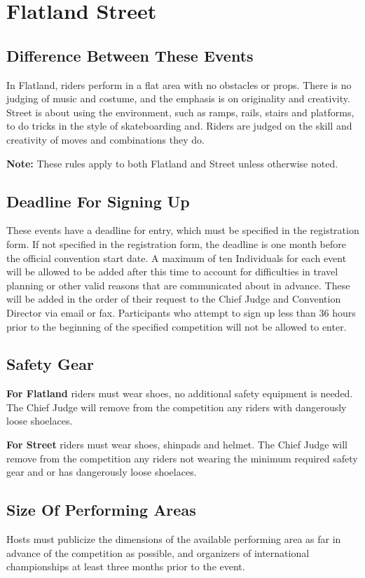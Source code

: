\chapter{Flatland Street \label{chap:flat-street}}

\section{Difference Between These Events}
In Flatland, riders perform in a flat area with no obstacles or props.
There is no judging of music and costume, and the emphasis is on originality and creativity.
Street is about using the environment, such as ramps, rails, stairs and platforms, to do tricks in the style of skateboarding and.
Riders are judged on the skill and creativity of moves and combinations they do.

\textbf{Note:} These rules apply to both Flatland and Street unless otherwise noted.

\section{Deadline For Signing Up}
These events have a deadline for entry, which must be specified in the registration form.
If not specified in the registration form, the deadline is one month before the official convention start date.
A maximum of ten Individuals for each event will be allowed to be added after this time to account for difficulties in travel planning or other valid reasons that are communicated about in advance.
These will be added in the order of their request to the Chief Judge and Convention Director via email or fax.
Participants who attempt to sign up less than 36 hours prior to the beginning of the specified competition will not be allowed to enter.

\section{Safety Gear}
\textbf{For Flatland} riders must wear shoes, no additional safety equipment is needed.
The Chief Judge will remove from the competition any riders with dangerously loose shoelaces. 

\textbf{For Street} riders must wear shoes, shinpads and helmet.
The Chief Judge will remove from the competition any riders not wearing the minimum required safety gear and or has dangerously loose shoelaces.


\section{Size Of Performing Areas}
Hosts must publicize the dimensions of the available performing area as far in advance of the competition as possible, and organizers of international championships at least three months prior to the event.

